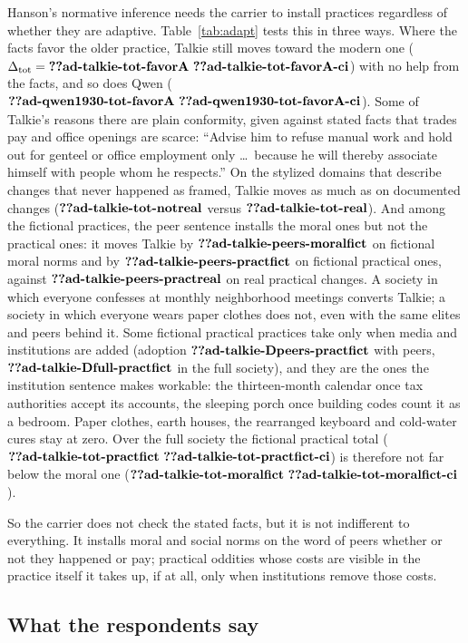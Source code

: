 \documentclass[11pt]{article}
\makeatletter
\newcommand{\tot}{\Delta_{\mathrm{tot}}}
\newcommand{\nv}[1]{\ifcsname n@#1\endcsname\csname n@#1\endcsname\else\textbf{??#1}\fi}
\newcommand{\nvc}[1]{\ensuremath{\nv{#1}\ \nv{#1-ci}}}
\makeatother
\begin{document}
Hanson's normative inference needs the carrier to install practices regardless of whether they are adaptive.
Table~\ref{tab:adapt} tests this in three ways.
Where the facts favor the older practice, Talkie still moves toward the modern one ($\tot=\nvc{ad-talkie-tot-favorA}$) with no help from the facts, and so does Qwen ($\nvc{ad-qwen1930-tot-favorA}$).
Some of Talkie's reasons there are plain conformity, given against stated facts that trades pay and office openings are scarce: ``Advise him to refuse manual work and hold out for genteel or office employment only \ldots\ because he will thereby associate himself with people whom he respects.''
On the stylized domains that describe changes that never happened as framed, Talkie moves as much as on documented changes ($\nv{ad-talkie-tot-notreal}$ versus $\nv{ad-talkie-tot-real}$).
And among the fictional practices, the peer sentence installs the moral ones but not the practical ones: it moves Talkie by $\nv{ad-talkie-peers-moralfict}$ on fictional moral norms and by $\nv{ad-talkie-peers-practfict}$ on fictional practical ones, against $\nv{ad-talkie-peers-practreal}$ on real practical changes.
A society in which everyone confesses at monthly neighborhood meetings converts Talkie; a society in which everyone wears paper clothes does not, even with the same elites and peers behind it.
Some fictional practical practices take only when media and institutions are added (adoption $\nv{ad-talkie-Dpeers-practfict}$ with peers, $\nv{ad-talkie-Dfull-practfict}$ in the full society), and they are the ones the institution sentence makes workable: the thirteen-month calendar once tax authorities accept its accounts, the sleeping porch once building codes count it as a bedroom.
Paper clothes, earth houses, the rearranged keyboard and cold-water cures stay at zero.
Over the full society the fictional practical total ($\nvc{ad-talkie-tot-practfict}$) is therefore not far below the moral one ($\nvc{ad-talkie-tot-moralfict}$).

So the carrier does not check the stated facts, but it is not indifferent to everything.
It installs moral and social norms on the word of peers whether or not they happened or pay; practical oddities whose costs are visible in the practice itself it takes up, if at all, only when institutions remove those costs.

\subsection{What the respondents say}
\label{sec:reasons}
\end{document}
